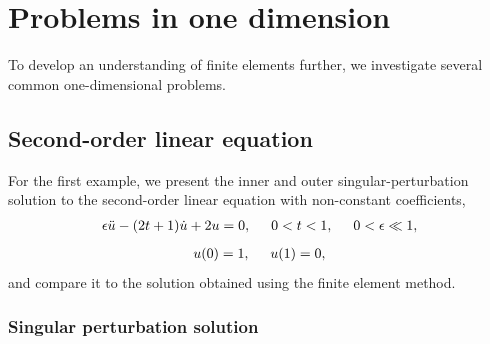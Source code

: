 
\chapter{Problems in one dimension}

To develop an understanding of finite elements further, we investigate several common one-dimensional problems.


\section{Second-order linear equation}

  For the first example, we present the inner and outer singular-perturbation solution  \citep{logan_2006} to the second-order linear equation with non-constant coefficients, 
  \begin{align}
    \label{1d_example_1_ode}
    \epsilon \ddot{u} - (2t + 1)\dot{u} + 2u = 0, \hspace{5mm} 0 < t < 1, \hspace{5mm} 0 < \epsilon \ll 1,
  \end{align}
  \begin{align}
    \label{1d_example_1_bcs}
    u(0) = 1, \hspace{5mm} u(1) = 0,
  \end{align}
  and compare it to the solution obtained using the finite element method.

  \subsection{Singular perturbation solution}

